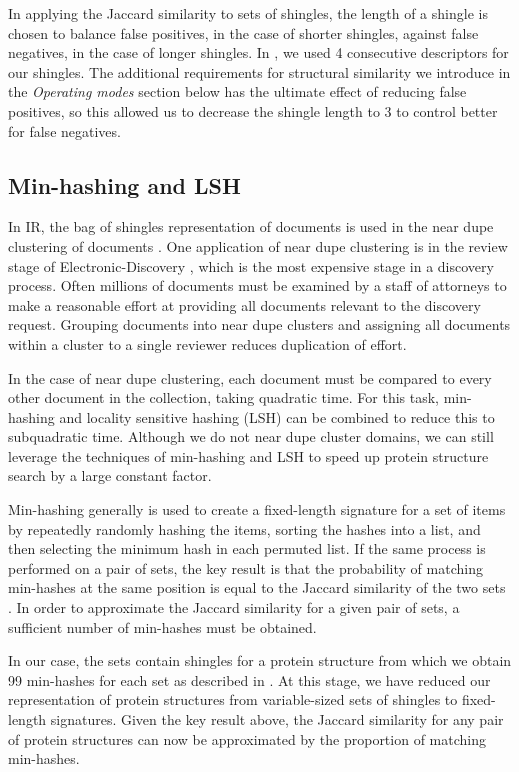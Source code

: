 \documentclass[10pt,letterpaper]{article}
\begin{document}
In applying the Jaccard similarity to sets of shingles, the length of a shingle is chosen to balance false positives, in the case of shorter shingles, against false negatives, in the case of longer shingles.
In \cite{Ayoub2017}, we used 4 consecutive descriptors for our shingles. 
The additional requirements for structural similarity we introduce in the \emph{Operating modes} section below has the ultimate effect of reducing false positives, so this allowed us to decrease the shingle length to 3 to control better for false negatives. 

\subsection*{Min-hashing and LSH}

In IR, the bag of shingles representation of documents is used in the near dupe clustering of documents \cite{Broder1997b}.
One application of near dupe clustering is in the review stage of Electronic-Discovery \cite{Joshi2008}, which is the most expensive stage in a discovery process. 
Often millions of documents must be examined by a staff of attorneys to make a reasonable effort at providing all documents relevant to the discovery request. 
Grouping documents into near dupe clusters and assigning all documents within a cluster to a single reviewer reduces duplication of effort. 

In the case of near dupe clustering, each document must be compared to every other document in the collection, taking quadratic time.
For this task, min-hashing \cite{Broder1998} and locality sensitive hashing (LSH) \cite{Indyk1998} can be combined to reduce this to subquadratic time. 
Although we do not near dupe cluster domains, we can still leverage the techniques of min-hashing and LSH to speed up protein structure search by a large constant factor.

Min-hashing generally is used to create a fixed-length signature for a set of items by repeatedly randomly hashing the items, sorting the hashes into a list, and then selecting the minimum hash in each permuted list.
If the same process is performed on a pair of sets, the key result is that the probability of matching min-hashes at the same position is equal to the Jaccard similarity of the two sets \cite{Broder1998}.
In order to approximate the Jaccard similarity for a given pair of sets, a sufficient number of min-hashes must be obtained. 

In our case, the sets contain shingles for a protein structure from which we obtain 99 min-hashes for each set as described in \cite{Rajaraman2012}. 
At this stage, we have reduced our representation of protein structures from variable-sized sets of shingles to fixed-length signatures.
Given the key result above, the Jaccard similarity for any pair of protein structures can now be approximated by the proportion of matching min-hashes. 
\end{document}
